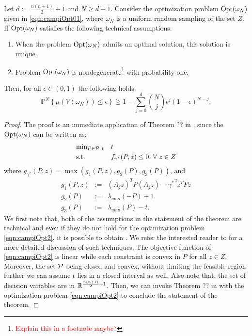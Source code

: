 \begin{theorem}\label{mainTheorem0}
Let $d:=\frac{n(n+1)}{2}+1$ and $N \geq d+1$. Consider the optimization problem $\text{Opt}(\omega_N)$ given in \eqref{eqn:campiOpt01}, where $\omega_N$ is a uniform random sampling of the set $Z$. If $\text{Opt}(\omega_N)$ satisfies the following technical assumptions:
\begin{enumerate}
\item When the problem $\text{Opt}(\omega_N)$ admits an optimal solution, this solution is unique.
\item Problem $\text{Opt}(\omega_N)$ is nondegenerate\footnote{\textcolor{red}{Explain this in a footnote maybe?}} with probability one.
\end{enumerate}
Then, for all $\epsilon \in (0,1)$ the following holds:
\begin{equation}\label{eqn:violation}\mathbb{P}^N\left\{ \mu(V(\omega_N)) \leq \epsilon \right\} \geq 1- \sum_{j=0}^{d} \binom{N}{j}\epsilon^j (1-\epsilon)^{N-j}.\end{equation}
\end{theorem}

\begin{proof}The proof is an immediate application of Theorem ?? in \cite{campi}, since the $\text{Opt}(\omega_N)$
can be written as:
\begin{equation}
\label{eqn:campiOpt2}
\begin{aligned}
& \text{min}_{P \in \mathcal{P},\, t} & & t \\
& \text{s.t.} 
& & f_{\gamma^*}(P, z) \leq 0,\,\forall\ z \in Z\end{aligned}
\end{equation}
where $g_{\gamma^*}(P,z) = \max(g_1(P, z), g_2(P), g_3(P))$, and 
\begin{eqnarray*}
g_1(P, z) &:=& (A_j z)^TP(A_j z) - {\gamma^*}^2 z^TPz \\
g_2(P) &:=& \lambda_{\max}(-P) +1. \\
g_3(P) &:=&  \lambda_{\max}(P) - t.
\end{eqnarray*}
We first note that, both of the assumptions in the statement of the theorem are technical and even if they do not hold for the optimization problem \ref{eqn:campiOpt2}, it is possible to obtain . We refer the interested reader to \cite{campi} for a more detailed discussion of such techniques. The objective function of \eqref{eqn:campiOpt2} is linear while each constraint is convex in $P$ for all $z \in Z$. Moreover, the set $\mathcal{P}$ being closed and convex, without limiting the feasible region further we can assume $t$ lies in a closed interval as well. Also note that, the set of decision variables are in $\mathbb{R}^{\frac{n(n+1)}{2}+1}.$  Then, we can invoke Theorem ?? in \cite{campi} with the optimization problem \eqref{eqn:campiOpt2} to conclude the statement of the theorem.
\end{proof}

